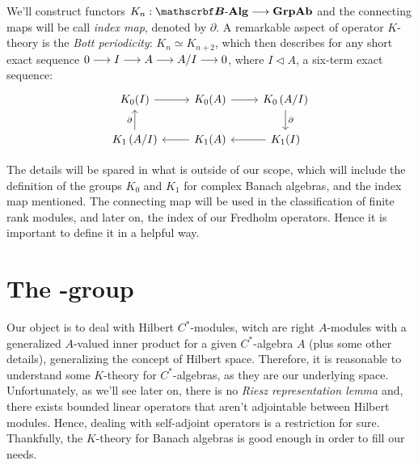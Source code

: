 We'll construct functors $K_n:\BAlg \longto \Ab{\Grp}$ and the connecting maps will be call \textit{index map}, denoted by $\partial$. A remarkable aspect of operator $K$-theory is the \textit{Bott periodicity}: $K_n \simeq K_{n+2}$, which then describes for any short exact sequence $0 \longrightarrow I \longrightarrow A \longrightarrow A/I \longrightarrow 0$, where $I\triangleleft A$, a six-term exact sequence:
\begin{equation*}
\begin{tikzcd}
K_0(I) \arrow[r]                                & K_0(A) \arrow[r] & K_0\left(A/I\right) \arrow[d, "\partial"] \\
K_1\left(A/I\right) \arrow[u, "\partial"] & K_1(A) \arrow[l] & K_1(I) \arrow[l]                               
\end{tikzcd}
\end{equation*}

The details will be spared in what is outside of our scope, which will include the definition of the groups $K_0$ and $K_1$ for complex Banach algebras, and the index map mentioned. The connecting map will be used in the classification of finite rank modules, and later on, the index of our Fredholm operators. Hence it is important to define it in a helpful way. 


\section[The \texorpdfstring{\ensuremath{K_0}}{K0} group]{The \texorpdfstring{}{K0}-group}
Our object is to deal with Hilbert $C^*$-modules, witch are right $A$-modules with a generalized $A$-valued inner product for a given $C^*$-algebra $A$ (plus some other details), generalizing the concept of Hilbert space. Therefore, it is reasonable to understand some $K$-theory for $C^*$-algebras, as they are our underlying space. Unfortunately, as we'll see later on, there is no \textit{Riesz representation lemma} and, there exists bounded linear operators that aren't adjointable between Hilbert modules. Hence, dealing with self-adjoint operators is a restriction for sure. Thankfully, the $K$-theory for Banach algebras is good enough in order to fill our needs.

